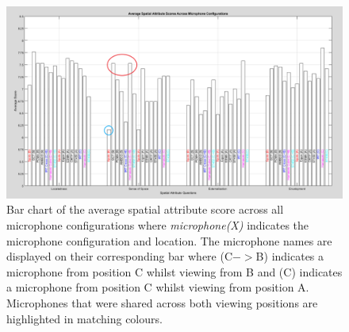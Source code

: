 		\begin{figure}
			\includegraphics[width=1\textwidth]{images/plots/allMics_edit.PNG}
			\caption{Bar chart of the average spatial attribute score across all microphone configurations where \textit{microphone(X)} indicates the microphone configuration and location. The microphone names are displayed on their corresponding bar where (C$->$B) indicates a microphone from position C whilst viewing from B and (C) indicates a microphone from position C whilst viewing from position A. Microphones that were shared across both viewing positions are highlighted in matching colours.}
			\label{image:sa_allmics} 
		\end{figure}